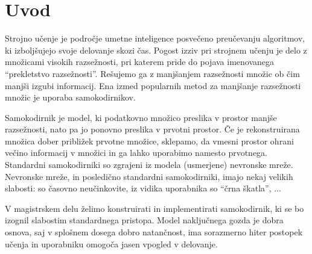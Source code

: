 \documentclass[12pt,a4paper,twoside]{article}
\theoremstyle{definition} %
\theoremstyle{plain} %
\numberwithin{equation}{section}  %
\begin{document}


\section{Uvod}



Strojno učenje je področje umetne inteligence posvečeno preučevanju algoritmov, ki izboljšujejo svoje delovanje skozi čas.
Pogost izziv pri strojnem učenju je delo z množicami visokih razsežnosti, pri katerem pride do pojava imenovanega ``prekletstvo razsežnosti''.
Rešujemo ga z manjšanjem razsežnosti množic ob čim manjši izgubi informacij.
Ena izmed popularnih metod za manjšanje razsežnosti množic je uporaba samokodirnikov.

Samokodirnik je model, ki podatkovno množico preslika v prostor manjše razsežnosti, nato pa jo ponovno preslika v prvotni prostor. %
Če je rekonstruirana množica dober približek prvotne množice, sklepamo, da vmesni prostor ohrani večino informacij v množici in ga lahko uporabimo namesto prvotnega. %
Standardni samokodirniki so zgrajeni iz modela (usmerjene) nevronske mreže.
Nevronske mreže, in posledično standardni samokodirniki, imajo nekaj velikih slabosti: so časovno neučinkovite, iz vidika uporabnika so ``črna škatla'', ...

V magistrskem delu želimo konstruirati in implementirati samokodirnik, ki se bo izognil slabostim standardnega pristopa.
Model naključnega gozda je dobra osnova, saj v splošnem dosega dobro natančnost, ima sorazmerno hiter postopek učenja in uporabniku omogoča jasen vpogled v delovanje.
\end{document}
